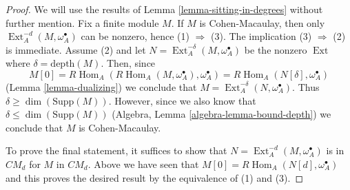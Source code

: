 \documentclass[10pt,a4paper]{amsart}
\theoremstyle{plain}
\theoremstyle{definition}
\theoremstyle{remark}
\numberwithin{equation}{subsection}
\def\Hom{\mathop{\mathrm{Hom}}\nolimits}
\def\Ext{\mathop{\mathrm{Ext}}\nolimits}
\begin{document}
\begin{proof}
We will use the results of Lemma \ref{lemma-sitting-in-degrees}
without further mention. Fix a finite module $M$.
If $M$ is Cohen-Macaulay, then only
$\Ext^{-d}_A(M, \omega_A^\bullet)$ can be nonzero,
hence (1) $\Rightarrow$ (3).
The implication (3) $\Rightarrow$ (2) is immediate.
Assume (2) and let $N = \Ext^{-\delta}_A(M, \omega_A^\bullet)$
be the nonzero $\Ext$ where $\delta = \text{depth}(M)$. Then, since
$$
M[0] = R\Hom_A(R\Hom_A(M, \omega_A^\bullet), \omega_A^\bullet) =
R\Hom_A(N[\delta], \omega_A^\bullet)
$$
(Lemma \ref{lemma-dualizing})
we conclude that $M = \Ext_A^{-\delta}(N, \omega_A^\bullet)$.
Thus $\delta \geq \dim(\text{Supp}(M))$. However,
since we also know that $\delta \leq \dim(\text{Supp}(M))$
(Algebra, Lemma \ref{algebra-lemma-bound-depth}) we conclude that $M$ is
Cohen-Macaulay.

\medskip\noindent
To prove the final statement, it suffices to show that
$N = \Ext^{-d}_A(M, \omega_A^\bullet)$ is in $CM_d$
for $M$ in $CM_d$. Above we have seen that
$M[0] = R\Hom_A(N[d], \omega_A^\bullet)$ and this proves the
desired result by the equivalence of (1) and (3).
\end{proof}
\end{document}
